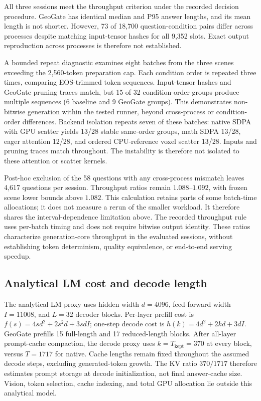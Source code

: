 All three sessions meet the throughput criterion under the recorded decision procedure. GeoGate has identical median and P95 answer lengths, and its mean length is not shorter. However, 73 of 18,700 question-condition pairs differ across processes despite matching input-tensor hashes for all 9,352 slots. Exact output reproduction across processes is therefore not established.

A bounded repeat diagnostic examines eight batches from the three scenes exceeding the 2,560-token preparation cap. Each condition order is repeated three times, comparing EOS-trimmed token sequences. Input-tensor hashes and GeoGate pruning traces match, but 15 of 32 condition-order groups produce multiple sequences (6 baseline and 9 GeoGate groups). This demonstrates non-bitwise generation within the tested runner, beyond cross-process or condition-order differences. Backend isolation repeats seven of these batches: native SDPA with GPU scatter yields 13/28 stable same-order groups, math SDPA 13/28, eager attention 12/28, and ordered CPU-reference voxel scatter 13/28. Inputs and pruning traces match throughout. The instability is therefore not isolated to these attention or scatter kernels.

Post-hoc exclusion of the 58 questions with any cross-process mismatch leaves 4,617 questions per session. Throughput ratios remain $1.088$--$1.092$, with frozen scene lower bounds above $1.082$. This calculation retains parts of some batch-time allocations; it does not measure a rerun of the smaller workload. It therefore shares the interval-dependence limitation above. The recorded throughput rule uses per-batch timing and does not require bitwise output identity. These ratios characterize generation-core throughput in the evaluated sessions, without establishing token determinism, quality equivalence, or end-to-end serving speedup.

\subsection{Analytical LM cost and decode length}
The analytical LM proxy uses hidden width $d=4096$, feed-forward width $I=11008$, and $L=32$ decoder blocks. Per-layer prefill cost is $f(s)=4sd^2+2s^2d+3sdI$; one-step decode cost is $h(k)=4d^2+2kd+3dI$. GeoGate prefills 15 full-length and 17 reduced-length blocks. After all-layer prompt-cache compaction, the decode proxy uses $k=T_{\text{kept}}=370$ at every block, versus $T=1717$ for native. Cache lengths remain fixed throughout the assumed decode steps, excluding generated-token growth. The KV ratio $370/1717$ therefore estimates prompt storage at decode initialization, not final answer-cache size. Vision, token selection, cache indexing, and total GPU allocation lie outside this analytical model.

